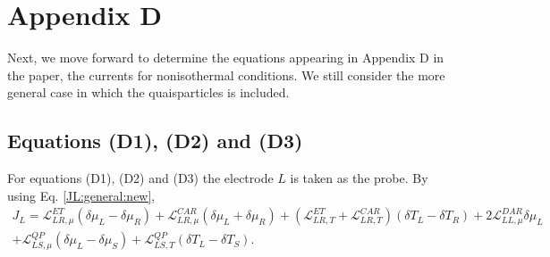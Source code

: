 \section{Appendix D}

Next, we move forward to determine the equations appearing in Appendix D in the paper, the currents for nonisothermal conditions. We still consider the more general case in which the quaisparticles is included.

\subsection{Equations (D1), (D2) and (D3)}
For equations (D1), (D2) and (D3) the electrode $L$ is taken as the probe. By using Eq. \eqref{JL:general:new},
\begin{multline*}
J_{L}=
\mathcal{L}_{LR,\mu}^{ET}(\delta\mu_{L}-\delta\mu_{R})+
\mathcal{L}_{LR,\mu}^{CAR}\left(\delta\mu_{L}+\delta\mu_{R}\right)
+
(\mathcal{L}_{LR,T}^{ET}+\mathcal{L}_{LR,T}^{CAR})(\delta T_{L}-\delta T_{R})
+
2\mathcal{L}_{LL,\mu}^{DAR}\delta\mu_{L}
\\+
\mathcal{L}^{QP}_{LS,\mu}(\delta\mu_{L}-\delta\mu_{S})
+
\mathcal{L}^{QP}_{LS,T}(\delta T_{L}-\delta T_{S}).
\end{multline*}

